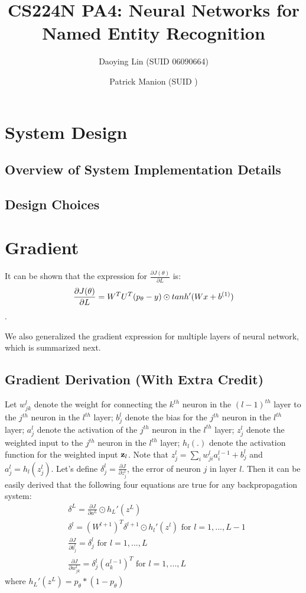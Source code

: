 \documentclass[11pt, oneside]{article}   	%
\title{CS224N PA4: Neural Networks for Named Entity Recognition}
\author{
	Daoying Lin (SUID 06090664)\\
	\and
	Patrick Manion (SUID )
}
\date{}							%
\begin{document}
\maketitle

\section{System Design}
\subsection{Overview of System Implementation Details}
\subsection{Design Choices}




\section{Gradient}
It can be shown that the expression for $\frac{\partial J(\theta)}{\partial L}$ is:
\[
\frac{\partial J(\theta)}{\partial L}
= W^T U^T (p_{\theta} - y) \odot tanh'(Wx + b^{(1)})  \\
\].

We also generalized the gradient expression for multiple layers of neural network, which is summarized next. 

\subsection{Gradient Derivation (With Extra Credit)}

Let $w_{jk}^l$ denote the weight for connecting the $k^{th}$ neuron in the $(l-1)^{th}$ layer to the $j^{th}$ neuron in the $l^{th}$ layer; $b_j^l$ denote the bias for the $j^{th}$ neuron in the $l^{th}$ layer; $a_j^l$ denote the activation of the $j^{th}$ neuron in the $l^{th}$ layer; $z_j^l$ denote the weighted input to the $j^{th}$ neuron in the $l^{th}$ layer; $h_l(.)$ denote the activation function for the weighted input $\bold{z}_l$.  Note that $z_j^l = \sum_{i} w_{ji}^l a_i^{l-1} + b_j^l$ and $a_j^l = h_l(z_j^l)$. Let's define $\delta_j^l = \frac{\partial J}{\partial z_j^l}$, the error of neuron $j$ in layer $l$. Then it can be easily derived that the following four equations are true for any backpropagation system:
\begin{subequations}
\begin{align}
& \delta^L = \frac{\partial J}{ \partial a^L} \odot h_L'(z^L) \\
& \delta^l  = (W^{l+1})^T \delta^{l+1} \odot h_l'(z^l)   \text{   for $l = 1, ..., L-1$} \\
& \frac{\partial J}{ \partial b_j^l}   = \delta_j^l  \text{   for $l = 1, ..., L$}  \\
& \frac{\partial J}{\partial w^l_{jk}} = \delta_j^l  (a_k^{l-1})^T  \text{   for $l = 1, ..., L$} 
\end{align}
\end{subequations}
where $h_L'(z^L) = p_{\theta} * (1 - p_{\theta})$
\end{document}
